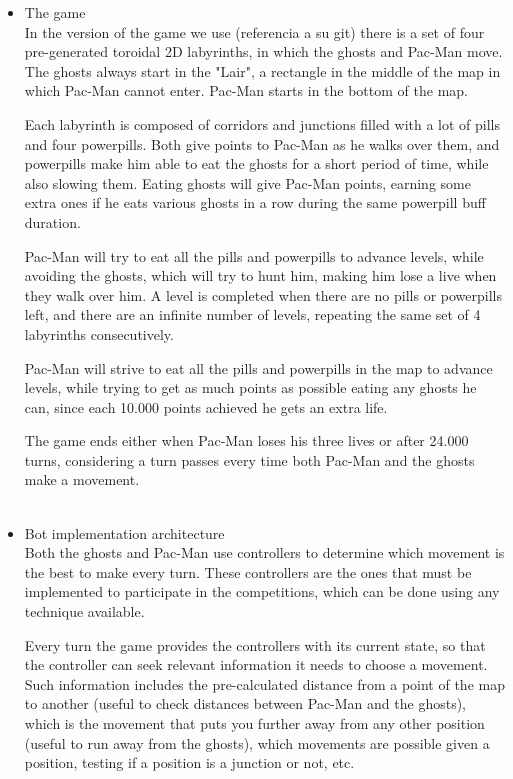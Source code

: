 \documentclass{llncs}
\newcommand{\paco}{Pac-Man }
\begin{document}
\begin{itemize}

\item The game
\\

In the version of the game we use {\color{red}(referencia a su git)} there is a set of four pre-generated toroidal 2D labyrinths, in which the ghosts and \paco move. The ghosts always start in the "Lair", a rectangle in the middle of the map in which \paco cannot enter. \paco starts in the bottom of the map.

Each labyrinth is composed of corridors and junctions filled with a lot of pills and four powerpills. Both give points to \paco as he walks over them, and powerpills make him able to eat the ghosts for a short period of time, while also slowing them. Eating ghosts will give \paco points, earning some extra ones if he eats various ghosts in a row during the same powerpill buff duration.

\paco will try to eat all the pills and powerpills to advance levels, while avoiding the ghosts, which will try to hunt him, making him lose a live when they walk over him. A level is completed when there are no pills or powerpills left, and there are an infinite number of levels, repeating the same set of 4 labyrinths consecutively.

\paco will strive to eat all the pills and powerpills in the map to advance levels, while trying to get as much points as possible eating any ghosts he can, since each 10.000 points achieved he gets an extra life.

The game ends either when \paco loses his three lives or after 24.000 turns, considering a turn passes every time both \paco and the ghosts make a movement.
\\
\\

\item Bot implementation architecture
\\

Both the ghosts and \paco use controllers to determine which movement is the best to make every turn. These controllers are the ones that must be implemented to participate in the competitions, which can be done using any technique available.

Every turn the game provides the controllers with its current state, so that the controller can seek relevant information it needs to choose a movement. Such information includes the pre-calculated distance from a point of the map to another (useful to check distances between \paco and the ghosts), which is the movement that puts you further away from any other position (useful to run away from the ghosts), which movements are possible given a position, testing if a position is a junction or not, etc. 


\end{itemize}
\end{document}
